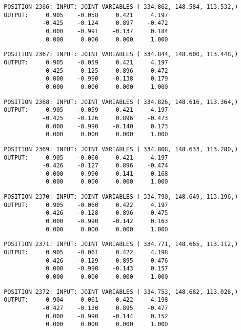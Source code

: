 \begin{verbatim}
POSITION 2366: INPUT: JOINT VARIABLES ( 334.862, 148.584, 113.532,)
OUTPUT:     0.905    -0.058     0.421     4.197
           -0.425    -0.124     0.897    -0.472
            0.000    -0.991    -0.137     0.184
            0.000     0.000     0.000     1.000
\end{verbatim} \pagebreak[1]\begin{verbatim}
POSITION 2367: INPUT: JOINT VARIABLES ( 334.844, 148.600, 113.448,)
OUTPUT:     0.905    -0.059     0.421     4.197
           -0.425    -0.125     0.896    -0.472
            0.000    -0.990    -0.138     0.179
            0.000     0.000     0.000     1.000
\end{verbatim} \pagebreak[1]\begin{verbatim}
POSITION 2368: INPUT: JOINT VARIABLES ( 334.826, 148.616, 113.364,)
OUTPUT:     0.905    -0.059     0.421     4.197
           -0.425    -0.126     0.896    -0.473
            0.000    -0.990    -0.140     0.173
            0.000     0.000     0.000     1.000
\end{verbatim} \pagebreak[1]\begin{verbatim}
POSITION 2369: INPUT: JOINT VARIABLES ( 334.808, 148.633, 113.280,)
OUTPUT:     0.905    -0.060     0.421     4.197
           -0.426    -0.127     0.896    -0.474
            0.000    -0.990    -0.141     0.168
            0.000     0.000     0.000     1.000
\end{verbatim} \pagebreak[1]\begin{verbatim}
POSITION 2370: INPUT: JOINT VARIABLES ( 334.790, 148.649, 113.196,)
OUTPUT:     0.905    -0.060     0.422     4.197
           -0.426    -0.128     0.896    -0.475
            0.000    -0.990    -0.142     0.163
            0.000     0.000     0.000     1.000
\end{verbatim} \pagebreak[1]\begin{verbatim}
POSITION 2371: INPUT: JOINT VARIABLES ( 334.771, 148.665, 113.112,)
OUTPUT:     0.905    -0.061     0.422     4.198
           -0.426    -0.129     0.895    -0.476
            0.000    -0.990    -0.143     0.157
            0.000     0.000     0.000     1.000
\end{verbatim} \pagebreak[1]\begin{verbatim}
POSITION 2372: INPUT: JOINT VARIABLES ( 334.753, 148.682, 113.028,)
OUTPUT:     0.904    -0.061     0.422     4.198
           -0.427    -0.130     0.895    -0.477
            0.000    -0.990    -0.144     0.152
            0.000     0.000     0.000     1.000
\end{verbatim} \pagebreak[1]\begin{verbatim}

\end{verbatim}
